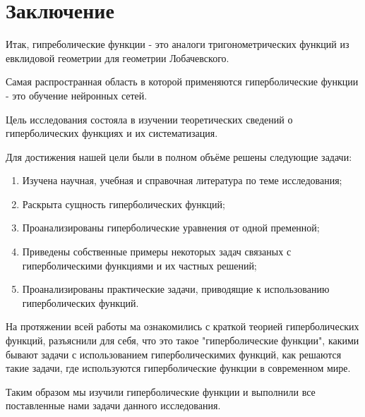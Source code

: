 \newpage
\section*{Заключение}

Итак, гипреболические функции - это аналоги тригонометрических функций из евклидовой геометрии для геометрии Лобачевского.

Самая распространная область в которой применяются гиперболические функции - это обучение нейронных сетей.

Цель исследования состояла в изучении теоретических сведений о гиперболических функциях и их систематизация.

Для достижения нашей цели были в полном объёме решены следующие задачи:
\begin{enumerate}
    \item Изучена научная, учебная и справочная литература по теме исследования;
    \item Раскрыта сущность гиперболических функций;
    \item Проанализированы гиперболические уравнения от одной пременной;
    \item Приведены собственные примеры некоторых задач связаных с гиперболическими функциями и их частных решений;
    \item Проанализированы практические задачи, приводящие к использованию гиперболических функций.
\end{enumerate}

На протяжении всей работы ма ознакомились с краткой теорией гиперболических функций, разъяснили для себя, что это такое "гиперболические функции", какими бывают задачи с использованием гиперболическимих функций, как решаются такие задачи, где используются гиперболические функции в современном мире.

Таким образом мы изучили гиперболические функции и выполнили все поставленные нами задачи данного исследования.